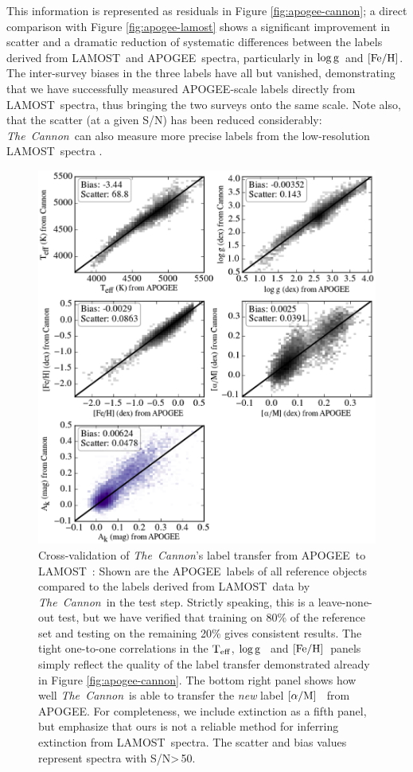 \documentclass[12pt, letterpaper, preprint]{aastex}
\newcommand{\tc}{\textsl{The~Cannon}}
\newcommand{\apogee}{APOGEE}
\newcommand{\lamost}{LAMOST}
\newcommand{\teff}{\mbox{$\rm T_{eff}$}}
\newcommand{\feh}{\mbox{$\rm [Fe/H]$}}
\newcommand{\alpham}{\mbox{$\rm [\alpha/M]$}}
\newcommand{\logg}{\mbox{$\rm \log g$}}
\newcommand{\snr}{S/N}
\begin{document}
This information is represented as residuals in
Figure \ref{fig:apogee-cannon}; a direct comparison with
Figure \ref{fig:apogee-lamost} shows a significant
improvement in scatter and a dramatic reduction of systematic
differences between the labels derived from \lamost\ and \apogee\  spectra, particularly in \logg\ and \feh .
The inter-survey biases in the three labels have all but vanished,
demonstrating that we have successfully measured \apogee-scale labels 
directly from \lamost\ spectra, thus bringing the two
surveys onto the same scale.
Note also, that the scatter (at a given \snr) has 
been reduced considerably: \tc\ can also measure more precise labels 
from the low-resolution \lamost\ spectra \citep{Ness2015}. 

\begin{figure}[!p]
\centering
\includegraphics[scale=0.73]{f5.eps}
\caption{Cross-validation of \tc 's label transfer from \apogee\ to \lamost~: Shown are the \apogee\ labels of all reference objects compared to the labels derived from \lamost\ data by \tc\ in the test step. Strictly speaking, this is a leave-none-out test, but we have verified that training on 80\% of the reference set and testing on the remaining 20\% gives consistent results. The tight one-to-one correlations in the \teff , \logg~ and \feh\ panels simply reflect the quality of the label transfer demonstrated already in Figure \ref{fig:apogee-cannon}.
The bottom right panel shows how well \tc\ is able to transfer the {\sl new} label  \alpham~ from \apogee.
For completeness, we include extinction as a fifth panel, 
but emphasize that ours is not a reliable method for 
inferring extinction from \lamost\ spectra.
The scatter and bias values represent spectra with \snr\textgreater\,50.
}
\label{fig:cross-validation}
\end{figure}
\end{document}
